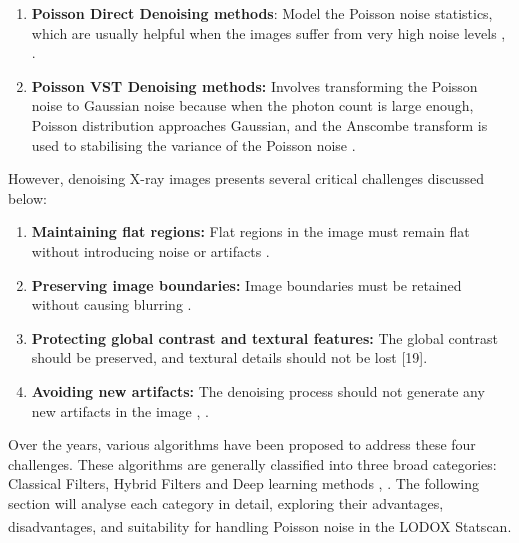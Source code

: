 \begin{enumerate}
    \item \textbf{Poisson Direct Denoising methods}: Model the Poisson noise statistics, which are usually helpful when the images suffer from very high noise levels \cite{kirti_poisson_2017}, \cite{kipele_poisson_2023}.
    \item \textbf{Poisson \gls{VST} Denoising methods:} Involves transforming the Poisson noise to Gaussian noise because when the photon count is large enough, Poisson distribution approaches Gaussian, and the \gls{Anscombe transform} is used to stabilising the variance of the Poisson noise \cite{kipele_poisson_2023}.
\end{enumerate}

However, denoising X-ray images presents several critical challenges discussed below:

\begin{enumerate}
    \item \textbf{Maintaining flat regions:} Flat regions in the image must remain flat without introducing noise or artifacts \cite{juneja_denoising_2024}.
    \item \textbf{Preserving image boundaries:} Image boundaries must be retained without causing blurring \cite{juneja_denoising_2024}.
    \item \textbf{Protecting global contrast and textural features:} The global contrast should be preserved, and textural details should not be lost [19].
    \item \textbf{Avoiding new artifacts:} The denoising process should not generate any new artifacts in the image \cite{juneja_denoising_2024}, \cite{thanh_review_2019}.
\end{enumerate}
 
 
Over the years, various algorithms have been proposed to address these four challenges. These algorithms are generally classified into three broad categories: Classical Filters, Hybrid Filters and Deep learning methods \cite{juneja_denoising_2024}, \cite{kirti_poisson_2017}. The following section will analyse each category in detail, exploring their advantages, disadvantages, and suitability for handling Poisson noise in the LODOX\textsuperscript{\textregistered} Statscan\textsuperscript{\textregistered}.

